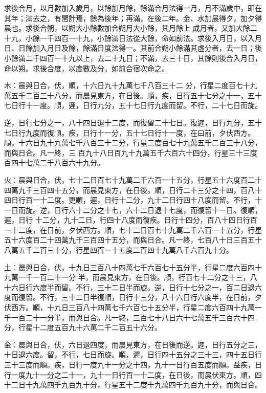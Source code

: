 \begin{pinyinscope}
 求後合月，以月數加入歲月，以餘加月餘，餘滿合月法得一月，月不滿歲中，即在其年；滿去之，有閏計焉，餘為後年；再滿，在後二年。金、水加晨得夕，加夕得晨也。求後合朔，以朔大小餘數加合朔月大小餘，其月餘上
 成月者，又加大餘二十九，小餘一千四百一十九，小餘滿日法從大餘，命如前法。求後入月日，以入月日、日餘加入月日及餘，餘滿日度法得一。其前合朔小餘滿其虛分者，去一日；後小餘滿二千四百一十九以上，去二十九日；不滿，去三十日，其餘則後合入月日，命以朔。求後合度，以度數及分，如前合宿次命之。



 木：晨與日合，伏，順，十六日九十九萬七千八百三十二
 分，行星二度百七十九萬五千二百三十八分，而晨見東方，在日後。順，疾，日行五十七分之十一，五十七日行十一度。順，遲，日行九分，五十七日行九度而留。不行，二十七日而旋。



 逆，日行七分之一，八十四日退十二度，而復留二十七日。復遲，日行九分，五十七日行九度而復順。疾，日行十一分，五十七日行十一度，在曰前，夕伏西方。順，十六日九十九萬七千八百三十二分，行星二度百七十九萬五千二百三十八分，而與日合。凡一終，三
 百九十八日百九十九萬五千六百六十四分，行星三十三度百四十七萬二千八百六十九分。



 火：晨與日合，伏，七十二日百七十九萬二千六百一十五分，行星五十六度百二十四萬九千三百四十五分，而晨見東方，在日後。順，日行二十三分之十四，百八十四日行百一十二度。更順，遲，日行十二分，九十二日行四十八度而留。不行，十一日而旋。逆，日行六十二分之十七，六十二日退十七度，而復留十一日。復順，遲，日行
 十二分，九十二日，行四十八度而復疾。日行十四分，百八十四日行百一十二度，在日前，夕伏西方。順，七十二日百七十九萬二千六百一十五分，行星五十六度百二十四萬九千三百四十五分，而與日合。凡一終，七百八十日三百五十八萬五千二百三十分，行星四百一十五度二百四十九萬八千六百九十分。



 土：晨與日合，伏，十九日三百八十四萬七千六百七十五分半，行星二度六百四十九萬一千一百二十一分
 半，而晨見東方，在日後。順，行百七十二分之十三，八十六日行六度半而留。不行，三十二日半而旋。逆，日行十七分之一，百二日退六度而復留。不行，三十二日半復順，日行十三分，八十六日行六度半，在日前，夕伏西方。順，十九日三百八十四萬七千六百七十五分半，行星二度六百四十九萬一千一百二十一分半，而與日合。凡一終，三百七十八日六十七萬五千三百六十四分，行星十二度五百九十六萬二千二百五十六分。



 金：晨與日合，伏，六日退四度，而晨見東方，在日後而逆。遲，日行五分之三，十日退六度。留，不行，七日而旋。順，遲，日行四十五分之三十三，四十五日行三十三度而順。疾，日行一度九十一分之十四，九十一日行百五度而順。益疾，日行一度九十一分之二十一，九十一日行百一十二度，在日後，而晨伏東方。順，四十二日十九萬四千九百九十分，行星五十二度十九萬四千九百九十分，而與日合。




\end{pinyinscope}
